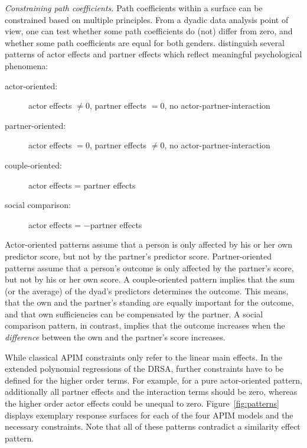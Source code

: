 \documentclass[jou,a4paper,draftfirst]{apa6}
\newcommand{\added}[1]{#1}
\begin{document}
\emph{Constraining path coefficients.}
Path coefficients \added{within a surface} can be constrained based on multiple principles. From a dyadic data analysis point of view, one can test whether some path coefficients do (not) differ from zero, and whether some path coefficients are equal for both genders. \textcite{kenny_partner_1999} distinguish several patterns of actor effects and partner effects which reflect meaningful psychological phenomena:

\begin{description}
	\item[actor-oriented:] actor effects $\neq 0$, partner effects $= 0$, no actor-partner-interaction
	\item[partner-oriented:] actor effects $= 0$, partner effects $\neq 0$, no actor-partner-interaction
	\item[couple-oriented:] actor effects = partner effects
	\item[social comparison:] actor effects = $-$partner effects
\end{description}

Actor-oriented patterns assume that a person is only affected by his or her own predictor score, but not by the partner's predictor score. Partner-oriented patterns assume that a person's outcome is only affected by the partner's score, but not by his or her own score. A couple-oriented pattern implies that the sum (or the average) of the dyad's predictors determines the outcome. This means, that the own and the partner's standing are equally important for the outcome, and that own sufficiencies can be compensated by the partner. A social comparison pattern, in contrast, implies that the outcome increases when the \emph{difference} between the own and the partner's score increases. 

While classical APIM constraints only refer to the linear main effects. In the extended polynomial regressions of the DRSA, further constraints have to be defined for the higher order terms. For example, for a pure actor-oriented pattern, additionally all partner effects and the interaction terms should be zero, whereas the higher order actor effects could be unequal to zero.
\added{Figure~\ref{fig:patterns} displays exemplary response surfaces for each of the four APIM models and the necessary constraints. Note that all of these patterns contradict a similarity effect pattern.}


\begin{figure*}[ht!]
\centering
{}
\caption{Examples for APIM patterns displayed as response surfaces. Figure available at \url{https://osf.io/ftsrd/}, under a CC-BY4.0 license.}
\label{fig:patterns}
\end{figure*}
\end{document}

